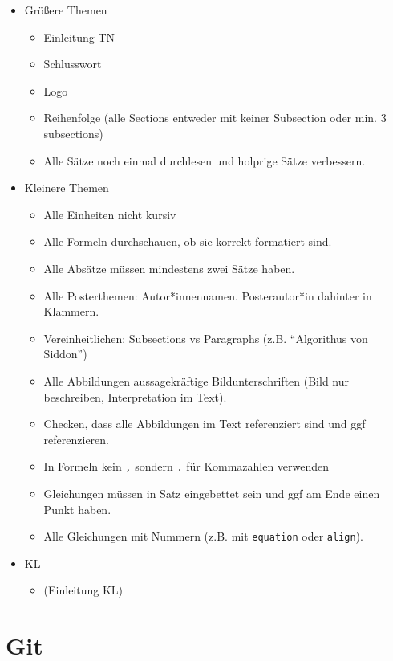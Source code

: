 \documentclass[]{dsadokumentation}
\begin{document}
\begin{itemize}
	\item Größere Themen
	\begin{itemize}
		\item Einleitung TN
		\item Schlusswort
		\item Logo
		\item Reihenfolge (alle Sections entweder mit keiner Subsection oder min. 3 subsections)
		\item Alle Sätze noch einmal durchlesen und holprige Sätze verbessern.
	\end{itemize}
	\item Kleinere Themen
	\begin{itemize}
		\item Alle Einheiten nicht kursiv
		\item Alle Formeln durchschauen, ob sie korrekt formatiert sind.
		\item Alle Absätze müssen mindestens zwei Sätze haben.
		\item Alle Posterthemen: Autor*innennamen. Posterautor*in dahinter in Klammern.
		\item Vereinheitlichen: Subsections vs Paragraphs (z.B. \enquote{Algorithus von Siddon})
		\item Alle Abbildungen aussagekräftige Bildunterschriften (Bild nur beschreiben, Interpretation im Text).
		\item Checken, dass alle Abbildungen im Text referenziert sind und ggf referenzieren.
		\item In Formeln kein \verb|,| sondern \verb|.| für Kommazahlen verwenden
		\item Gleichungen müssen in Satz eingebettet sein und ggf am Ende einen Punkt haben.
		\item Alle Gleichungen mit Nummern (z.B. mit \verb|equation| oder \verb|align|).
	\end{itemize}
	\item KL
	\begin{itemize}
		\item (Einleitung KL)
	\end{itemize}
\end{itemize}

\cleardoublepage

\tableofcontents


\section{Git}
\end{document}
